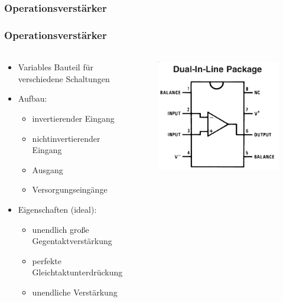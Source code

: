 \subsubsection{Operationsverstärker} %
\label{ssub:Operationsverstärker}

\begin{frame}
    \frametitle{Operationsverstärker}
    \framesubtitle{}
    \begin{columns}[c]
    \begin{block}{}
        \begin{itemize}
            \item Variables Bauteil für verschiedene Schaltungen
            \item Aufbau:
                \begin{itemize}
                    \item invertierender Eingang
                    \item nichtinvertierender Eingang
                    \item Ausgang
                    \item Versorgungseingänge
                \end{itemize}
            \item Eigenschaften (ideal):
                \begin{itemize}
                    \item unendlich große Gegentaktverstärkung
                    \item perfekte Gleichtaktunterdrückung 
                    \item unendliche Verstärkung
                \end{itemize}
        \end{itemize}
    \end{block}
    \begin{figure}[H]
    \begin{center}
            \includegraphics[scale=0.15]{./img/misc/opv_pins.png}

\end{center}
\end{figure}
\end{columns}
\end{frame}
